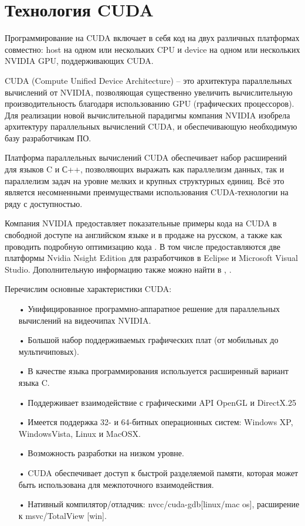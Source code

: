 \documentclass[a4paper,14pt,russian]{extreport}
\begin{document}
\section{Технология CUDA}

Программирование на CUDA включает в себя код на двух различных платформах совместно: host на одном или нескольких CPU и device на одном или нескольких NVIDIA GPU, поддерживающих CUDA.
\par CUDA (Compute Unified Device Architecture) – это архитектура параллельных вычислений от NVIDIA, позволяющая существенно увеличить вычислительную производительность благодаря использованию GPU (графических процессоров). Для реализации новой вычислительной парадигмы компания NVIDIA изобрела архитектуру параллельных вычислений CUDA, и обеспечивающую необходимую базу разработчикам ПО.
\par Платформа параллельных вычислений CUDA обеспечивает набор расширений для языков C и С++, позволяющих выражать как параллелизм данных, так и параллелизм задач на уровне мелких и крупных структурных единиц. Всё это является несомненными преимуществами использования CUDA-технологии на ряду с доступностью.
\par Компания NVIDIA предоставляет показательные примеры кода на CUDA \cite{sanders} в свободной доступе на английском языке и в продаже на русском, а также как проводить подробную оптимизацию кода \cite{cuda_best}. В том числе предоставляются две платформы Nvidia Nsight Edition для разработчиков в Eclipse и Microsoft Visual Studio. Дополнительную информацию также можно найти в \cite{kirk}, \cite{boreskov}.
\par Перечислим основные характеристики CUDA:
  \begin{itemize}
  \item[•] Унифицированное программно-аппаратное решение для параллельных вычислений на видеочипах NVIDIA.
  \item[•] Большой набор поддерживаемых графических плат (от мобильных до мультичиповых).
  \item[•] В качестве языка программирования используется расширенный вариант языка C.
  \item[•] Поддерживает взаимодействие с графическими API OpenGL и DirectX.25
  \item[•] Имеется поддержка 32- и 64-битных операционных систем: Windows XP, WindowsVista, Linux и MacOSX.
  \item[•] Возможность разработки на низком уровне.
  \item[•] CUDA обеспечивает доступ к быстрой разделяемой памяти, которая может быть использована для межпоточного взаимодействия.
  \item[•] Нативный компилятор/отладчик: nvcc/cuda-gdb[linux/mac os], расширение к msvc/TotalView [win]. 
  \end{itemize}
\end{document}
